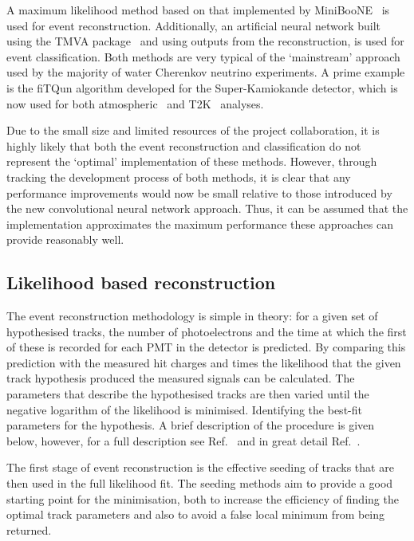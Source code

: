 A maximum likelihood method based on that implemented by MiniBooNE~\cite{patterson2009} is used
for event reconstruction. Additionally, an artificial neural network built using the TMVA
package~\cite{hocker2007} and using outputs from the reconstruction, is used for event
classification. Both methods are very typical of the `mainstream' approach used by the majority of
water Cherenkov neutrino experiments. A prime example is the fiTQun algorithm developed for the
Super-Kamiokande detector, which is now used for both atmospheric~\cite{jiang2019} and
T2K~\cite{missert2017} analyses.

Due to the small size and limited resources of the \chips project collaboration, it is highly
likely that both the event reconstruction and classification do not represent the `optimal'
implementation of these methods. However, through tracking the development process of both
methods, it is clear that any performance improvements would now be small relative to those
introduced by the new convolutional neural network approach. Thus, it can be assumed that the
implementation approximates the maximum performance these approaches can provide reasonably well.

\subsection{Likelihood based reconstruction} %
\label{sec:cvn_old_reco} %

The event reconstruction methodology is simple in theory: for a given set of hypothesised tracks,
the number of photoelectrons and the time at which the first of these is recorded for each PMT in
the detector is predicted. By comparing this prediction with the measured hit charges and times
the likelihood that the given track hypothesis produced the measured signals can be calculated.
The parameters that describe the hypothesised tracks are then varied until the negative logarithm
of the likelihood is minimised. Identifying the best-fit parameters for the hypothesis. A brief
description of the procedure is given below, however, for a full description see
Ref.~\cite{blake2016} and in great detail Ref.~\cite{perch2017}.

The first stage of event reconstruction is the effective seeding of tracks that are then used in
the full likelihood fit. The seeding methods aim to provide a good starting point for the
minimisation, both to increase the efficiency of finding the optimal track parameters and also to
avoid a false local minimum from being returned.

